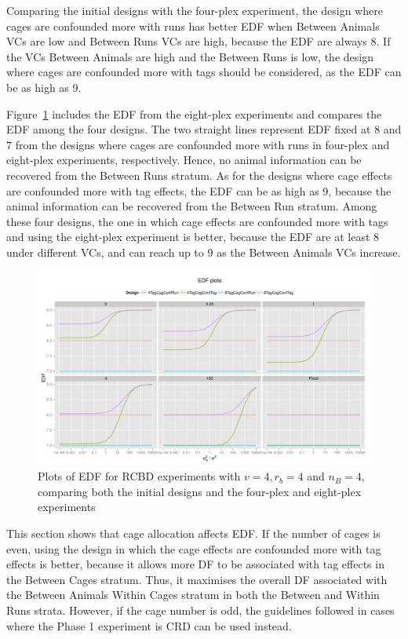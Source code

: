 \documentclass[12pt,a4paper]{article}
\begin{document}
Comparing the initial designs with the four-plex experiment, the design where cages are confounded more with runs has better EDF when Between Animals VCs are low and Between Runs VCs are high, because the EDF are always 8. If the VCs Between Animals are high and the Between Runs is low, the design where cages are confounded more with tags should be considered, as the EDF can be as high as 9.

Figure~\ref{fig:RCBD442Tag4vsTag8} includes the EDF from the eight-plex experiments and compares the EDF among the four designs. The two straight lines represent EDF fixed at $8$ and $7$ from the designs where cages are confounded more with runs in four-plex and eight-plex experiments, respectively. Hence, no animal information can be recovered from the Between Runs stratum. As for the designs where cage effects are confounded more with tag effects, the EDF can be as high as 9, because the animal information can be recovered from the Between Run stratum. Among these four designs, the one in which cage effects are confounded more with tags and using the eight-plex experiment is better, because the EDF are at least 8 under different VCs, and can reach up to 9 as the Between Animals VCs increase.    

\begin{figure}[h!]
\centering
\includegraphics[width=1 \textwidth]{Graph/RBD442Tag4vsTag8.pdf}
\caption{Plots of EDF for RCBD experiments with $v = 4, r_b = 4$ and $n_B = 4$, comparing both the initial designs and the four-plex and eight-plex experiments}
\label{fig:RCBD442Tag4vsTag8}
\end{figure}

This section shows that cage allocation affects EDF. If the number of cages is even, using the design in which the cage effects are confounded more with tag effects is better, because it allows more DF to be associated with tag effects in the Between Cages stratum. Thus, it maximises the overall DF associated with the Between Animals Within Cages stratum in both the Between and Within Runs strata. However, if the cage number is odd, the guidelines followed in cases where the Phase 1 experiment is CRD can be used instead.  
\end{document}
